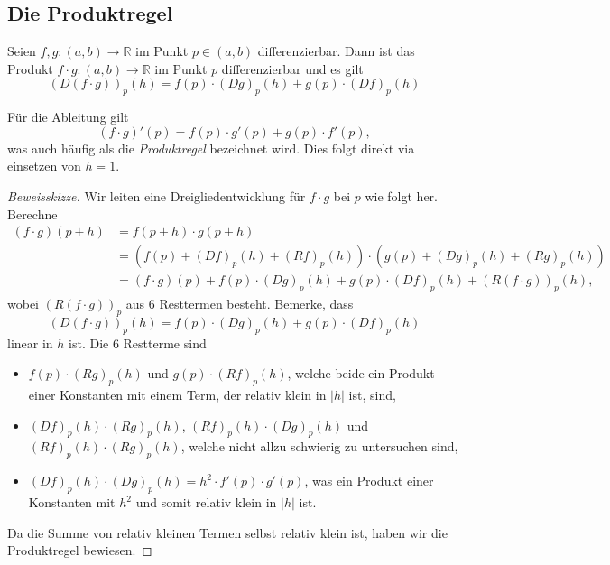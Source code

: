 \documentclass[../main.tex]{subfiles}
\begin{document}
\subsection*{Die Produktregel}
\begin{productrule}
Seien $f, g \colon (a, b) \to \mathbb{R}$
im Punkt $p \in (a, b)$ differenzierbar.
Dann ist das Produkt
$f \cdot g \colon (a, b) \to \mathbb{R}$
im Punkt $p$ differenzierbar und es gilt
\[
  {(D(f \cdot g))}_p(h) = f(p) \cdot
  {(Dg)}_p(h) + g(p) \cdot {(Df)}_p(h)
\]
\end{productrule}

\begin{remark}
  Für die Ableitung gilt
  \[
    {(f\cdot g)}'(p) = f(p) \cdot g'(p) + g(p) \cdot f'(p),
  \]
  was auch häufig als die \emph{Produktregel}
  bezeichnet wird.
  Dies folgt direkt via einsetzen von $h = 1$.
\end{remark}

\begin{proof}[Beweisskizze]
  Wir leiten eine Dreigliedentwicklung für $f \cdot g$
  bei $p$ wie folgt her. Berechne
  \begin{align*}
    (f \cdot g) (p+h)
    & = f(p+h) \cdot g(p+h)\\
    &= \left( f(p) + {(Df)}_p(h) + {(Rf)}_p(h) \right)
    \cdot \left( g(p) + {(Dg)}_p(h) + {(Rg)}_p(h) \right) \\
    &= (f \cdot g)(p)
    + f(p) \cdot {(Dg)}_p(h) + g(p) \cdot {(Df)}_p(h)
    + {(R(f \cdot g))}_p(h),
  \end{align*}
  wobei ${(R(f \cdot g))}_p$ aus $6$ Resttermen
  besteht.
  Bemerke, dass
  \[
    {(D(f \cdot g))}_p(h) = f(p) \cdot {(Dg)}_p(h)
    + g(p) \cdot {(Df)}_p(h)
  \]
  linear in $h$ ist.
  Die $6$ Restterme sind
  \begin{itemize}
    \item $f(p) \cdot {(Rg)}_p(h)$ und
      $g(p) \cdot {(Rf)}_p(h)$, welche beide
      ein Produkt einer Konstanten
      mit einem Term, der relativ klein in $|h|$ ist, sind, %
    \item ${(Df)}_p(h) \cdot {(Rg)}_p(h)$,
      ${(Rf)}_p(h) \cdot {(Dg)}_p(h)$ und
      ${(Rf)}_p(h) \cdot {(Rg)}_p(h)$,
      welche nicht allzu schwierig zu untersuchen sind,
    \item ${(Df)}_p(h) \cdot {(Dg)}_p(h) = h^2
      \cdot f'(p) \cdot g'(p)$, was ein Produkt
      einer Konstanten
      mit $h^2$ und somit relativ klein in $|h|$ ist.
  \end{itemize}
  Da die Summe von relativ kleinen Termen selbst relativ
  klein ist, haben wir die Produktregel bewiesen.
\end{proof}
\end{document}
